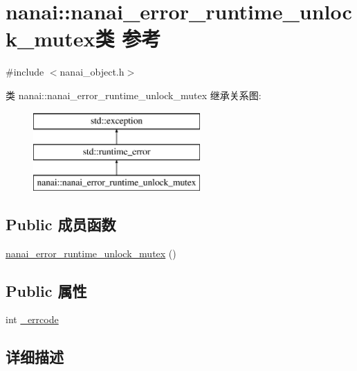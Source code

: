 \hypertarget{classnanai_1_1nanai__error__runtime__unlock__mutex}{}\section{nanai\+:\+:nanai\+\_\+error\+\_\+runtime\+\_\+unlock\+\_\+mutex类 参考}
\label{classnanai_1_1nanai__error__runtime__unlock__mutex}


{\ttfamily \#include $<$nanai\+\_\+object.\+h$>$}

类 nanai\+:\+:nanai\+\_\+error\+\_\+runtime\+\_\+unlock\+\_\+mutex 继承关系图\+:\begin{figure}[H]
\begin{center}
\leavevmode
\includegraphics[height=3.000000cm]{classnanai_1_1nanai__error__runtime__unlock__mutex}
\end{center}
\end{figure}
\subsection*{Public 成员函数}
\begin{DoxyCompactItemize}
\item 
\hyperlink{classnanai_1_1nanai__error__runtime__unlock__mutex_a7f077e10b1c5ecf91f7b001d4bf5436f}{nanai\+\_\+error\+\_\+runtime\+\_\+unlock\+\_\+mutex} ()
\end{DoxyCompactItemize}
\subsection*{Public 属性}
\begin{DoxyCompactItemize}
\item 
int \hyperlink{classnanai_1_1nanai__error__runtime__unlock__mutex_aba361f162e36f4a3a7d9028832bf65e6}{\+\_\+errcode}
\end{DoxyCompactItemize}


\subsection{详细描述}



